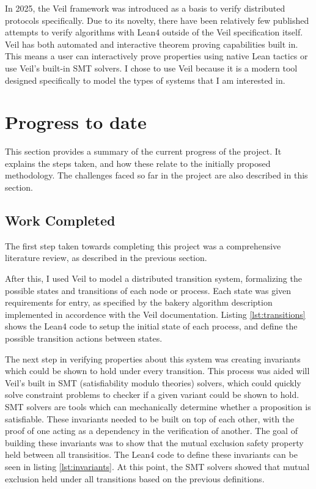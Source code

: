 \documentclass{article}
\theoremstyle{definition}
\begin{document}
        In 2025, the Veil \cite{pirleaVeilFrameworkAutomated2025a} framework was introduced as a basis to verify distributed protocols specifically.
        Due to its novelty, there have been relatively few published attempts to verify algorithms with Lean4 outside of the Veil specification itself.
        Veil has both automated and interactive theorem proving capabilities built in. 
        This means a user can interactively prove properties using native Lean tactics or use Veil's built-in SMT solvers.
        I chose to use Veil because it is a modern tool designed specifically to model the types of systems that I am interested in.


\section{Progress to date}
    This section provides a summary of the current progress of the project. 
    It explains the steps taken, and how these relate to the initially proposed methodology.
    The challenges faced so far in the project are also described in this section.

    \subsection{Work Completed}
        The first step taken towards completing this project was a comprehensive literature review, 
        as described in the previous section.
        
        After this, I used Veil to model a distributed transition system, formalizing the possible states and transitions of each node or process.
        Each state was given requirements for entry, as specified by the bakery algorithm description implemented in accordence with the Veil documentation.
        Listing \ref{lst:transitions} shows the Lean4 code to setup the initial state of each process,
        and define the possible transition actions between states.

        The next step in verifying properties about this system was creating invariants which could be shown to hold 
        under every transition.
        This process was aided will Veil's built in SMT (satisfiability modulo theories) solvers, which could quickly solve constraint problems to checker
        if a given variant could be shown to hold. 
        SMT solvers are tools which can mechanically determine whether a proposition is satisfiable.
        These invariants needed to be built on top of each other, with the proof of one acting as a dependency in the 
        verification of another.
        The goal of building these invariants was to show that the mutual exclusion safety property held between all transisitios.
        The Lean4 code to define these invariants can be seen in listing \ref{lst:invariants}.
        At this point, the SMT solvers showed that mutual exclusion held under all transitions based on the
        previous definitions. 
\end{document}
